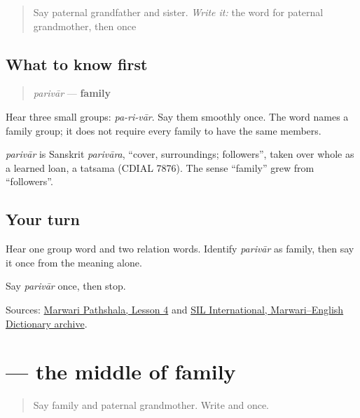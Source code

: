 \begin{quote}
Say paternal grandfather and sister. \emph{Write it:} the word for paternal grandmother, then \textbf{} once
\end{quote}

\subsection*{What to know first}
\begin{quote}
\emph{parivār} — \textbf{family}
\end{quote}

Hear three small groups: \emph{pa-ri-vār}. Say them smoothly once. The word names a family group; it does not require every family to have the same members.

\begin{cousinweb}
\emph{parivār} is Sanskrit \emph{parivāra}, \textquotedblleft{}cover, surroundings; followers\textquotedblright{}, taken over whole as a learned loan, a tatsama (CDIAL 7876). The sense \textquotedblleft{}family\textquotedblright{} grew from \textquotedblleft{}followers\textquotedblright{}.
\end{cousinweb}

\subsection*{Your turn}
Hear one group word and two relation words. Identify \emph{parivār} as family, then say it once from the meaning alone.

\begin{tcolorbox}[breakable,colback=teal!4,colframe=teal!35!black,title={Before you move on}]
Say \emph{parivār} once, then stop.

Sources: \href{https://www.marwaripathshala.com/marwari-lesson-4-english}{Marwari Pathshala, Lesson 4} and \href{https://nepal.sil.org/resources/archives/63768}{SIL International, Marwari–English Dictionary archive}.
\end{tcolorbox}
\section[\texorpdfstring{\mw{व} (va)}{व (va)}]{ — the middle of family}

\label{lesson:MW-W08-va}



\begin{quote}
Say family and paternal grandmother. Write \textbf{} and \textbf{} once.
\end{quote}

